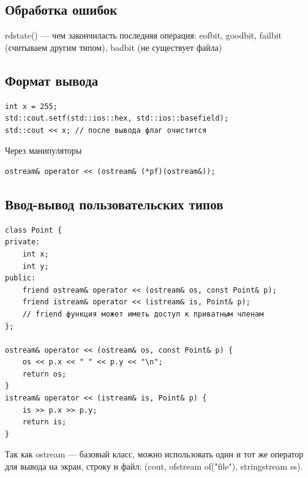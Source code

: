 \subsection{Обработка ошибок}
rdstate() --- чем закончиласть последняя операция: eofbit, goodbit, failbit (считываем другим типом), badbit (не существует файла)
\subsection{Формат вывода}
\begin{verbatim}
int x = 255;
std::cout.setf(std::ios::hex, std::ios::basefield);
std::cout << x; // после вывода флаг очистится
\end{verbatim}
Через манипуляторы
\begin{verbatim}
ostream& operator << (ostream& (*pf)(ostream&));
\end{verbatim}
\subsection{Ввод-вывод пользовательских типов}
\begin{verbatim}
class Point {
private:
    int x;
    int y;
public:
    friend ostream& operator << (ostream& os, const Point& p);
    friend istream& operator << (istream& is, Point& p);
    // friend функция может иметь доступ к приватным членам
};

ostream& operator << (ostream& os, const Point& p) {
    os << p.x << " " << p.y << "\n";
    return os;
}
istream& operator << (istream& is, Point& p) {
    is >> p.x >> p.y;
    return is;
}
\end{verbatim}
Так как ostream --- базовый класс, можно использовать один и тот же оператор для вывода на экран, строку и файл:
(cout, ofstream of("file"), stringstream ss).

